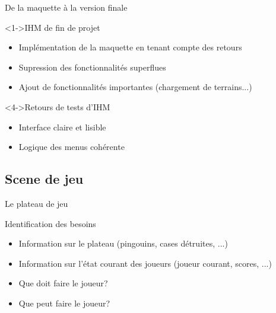 \documentclass{beamer}
\begin{document}
\begin{frame}{De la maquette à la version finale}
  \begin{block}<1->{IHM de fin de projet}
	\begin{itemize}
	\item <1-> Implémentation de la maquette en tenant compte des retours
	\item <2-> Supression des fonctionnalités superflues
	\item <3-> Ajout de fonctionnalités importantes (chargement de terrains...)
  	\end{itemize}
  \end{block}
  \begin{block}<4->{Retours de tests d'IHM}
    \begin{itemize}
	\item <4-> Interface claire et lisible
	\item <5-> Logique des menus cohérente
	\end{itemize}
  \end{block}
\end{frame}

\subsection{Scene de jeu}

\begin{frame}{Le plateau de jeu}
  \begin{block}{Identification des besoins}
    \begin{itemize}
    \item <1-> Information sur le plateau (pingouins, cases détruites, ...)
    \item <2-> Information sur l'état courant des joueurs (joueur courant, scores, ...)
    \item <3-> Que doit faire le joueur?
    \item <4-> Que peut faire le joueur?
    \end{itemize}
  \end{block}
\end{frame}
\end{document}
